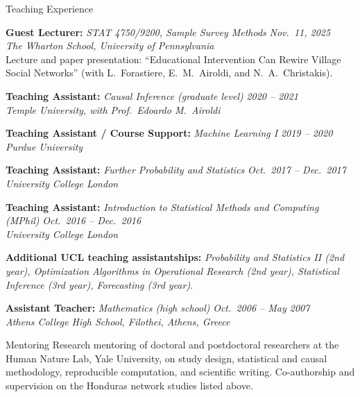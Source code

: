 \documentclass{resume}
\begin{document}
\begin{rSection}{Teaching Experience}

{\bf Guest Lecturer:} \textit{STAT 4750/9200, Sample Survey Methods} \hfill {\em Nov.\ 11, 2025}\\
\textit{The Wharton School, University of Pennsylvania}\\
{\small Lecture and paper presentation: ``Educational Intervention Can Rewire Village Social Networks'' (with L.\ Forastiere, E.\ M.\ Airoldi, and N.\ A.\ Christakis).}

{\bf Teaching Assistant:} \textit{Causal Inference (graduate level)} \hfill {\em 2020 -- 2021}\\
\textit{Temple University, with Prof.\ Edoardo M.\ Airoldi}

{\bf Teaching Assistant / Course Support:} \textit{Machine Learning I} \hfill {\em 2019 -- 2020}\\
\textit{Purdue University}

{\bf Teaching Assistant:} \textit{Further Probability and Statistics} \hfill {\em Oct.\ 2017 -- Dec.\ 2017}\\
\textit{University College London}

{\bf Teaching Assistant:} \textit{Introduction to Statistical Methods and Computing (MPhil)} \hfill {\em Oct.\ 2016 -- Dec.\ 2016}\\
\textit{University College London}

{\bf Additional UCL teaching assistantships:} \textit{Probability and Statistics II (2nd year), Optimization Algorithms in Operational Research (2nd year), Statistical Inference (3rd year), Forecasting (3rd year).}

{\bf Assistant Teacher:} \textit{Mathematics (high school)} \hfill {\em Oct.\ 2006 -- May 2007}\\
\textit{Athens College High School, Filothei, Athens, Greece}
\end{rSection}

\begin{rSection}{Mentoring}
Research mentoring of doctoral and postdoctoral researchers at the Human Nature Lab, Yale University, on study design, statistical and causal methodology, reproducible computation, and scientific writing. Co-authorship and supervision on the Honduras network studies listed above.
\end{rSection}
\end{document}
